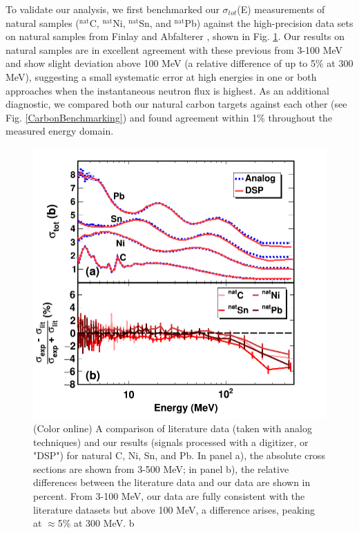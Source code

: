 \documentclass[twocolumn,secnumarabic,amssymb, nobibnotes, aps, prl,
superscriptaddress, nobalancelastpage]{revtex4}
\newcommand{\totEs}{\ensuremath{\sigma_{tot}}(E)\,\,}
\begin{document}
To validate our analysis, we first benchmarked our \totEs measurements of natural samples
($^{\text{nat}}$C, $^{\text{nat}}$Ni, $^{\text{nat}}$Sn, and
$^{\text{nat}}$Pb) against the high-precision data sets on natural samples from Finlay
\cite{Finlay1993} and Abfalterer \cite{Abfalterer2001}, shown in Fig.
\ref{LiteratureBenchmarking}. Our results on natural samples are in excellent agreement with 
these previous from 3-100 MeV and show slight deviation above 100 MeV (a
relative difference of up to 5\% at 300 MeV), suggesting a small systematic
error at high energies in one or both approaches when the instantaneous neutron
flux is highest. As an additional diagnostic, we compared 
both our natural carbon targets against each other (see Fig.
\ref{CarbonBenchmarking}) and found agreement within 1\% throughout the measured
energy domain.

\begin{figure}
    \includegraphics[scale=0.5]{figures/literatureBenchmarking.png}
    \caption{(Color online) A comparison of literature data (taken with analog
    techniques) and our results (signals processed with a digitizer, or "DSP")
    for natural C, Ni, Sn, and Pb. In panel a), the absolute cross sections are shown from
    3-500 MeV; in panel b), the relative differences between the literature data and
    our data are shown in percent. From 3-100 MeV, our data are fully consistent with the
    literature datasets but above 100 MeV, a difference arises, peaking at
    $\approx$5\% at 300 MeV.
b}
    \label{LiteratureBenchmarking}
\end{figure}
\end{document}
